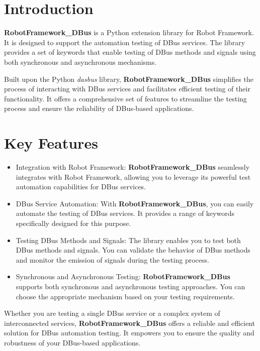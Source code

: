 %



%


\section{Introduction}

\textbf{RobotFramework\_DBus} is a Python extension library for Robot Framework. It is designed to support the automation testing of DBus services. The library provides a set of keywords that enable testing of DBus methods and signals using both synchronous and asynchronous mechanisms.

Built upon the Python \textit{dasbus} library, \textbf{RobotFramework\_DBus} simplifies the process of interacting with DBus services and facilitates efficient testing of their functionality. It offers a comprehensive set of features to streamline the testing process and ensure the reliability of DBus-based applications.

\section{Key Features}

\begin{itemize}
  \item Integration with Robot Framework: \textbf{RobotFramework\_DBus} seamlessly integrates with Robot Framework, allowing you to leverage its powerful test automation capabilities for DBus services.
  \item DBus Service Automation: With \textbf{RobotFramework\_DBus}, you can easily automate the testing of DBus services. It provides a range of keywords specifically designed for this purpose.
  \item Testing DBus Methods and Signals: The library enables you to test both DBus methods and signals. You can validate the behavior of DBus methods and monitor the emission of signals during the testing process.
  \item Synchronous and Asynchronous Testing: \textbf{RobotFramework\_DBus} supports both synchronous and asynchronous testing approaches. You can choose the appropriate mechanism based on your testing requirements.
\end{itemize}

Whether you are testing a single DBus service or a complex system of interconnected services, \textbf{RobotFramework\_DBus} offers a reliable and efficient solution for DBus automation testing. It empowers you to ensure the quality and robustness of your DBus-based applications.


